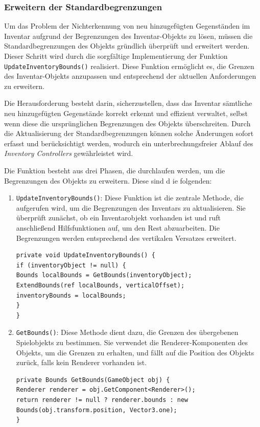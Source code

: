 \begin{itemize}
\subsubsection{Erweitern der Standardbegrenzungen}
Um das Problem der Nichterkennung von neu hinzugefügten Gegenständen im Inventar aufgrund der Begrenzungen des Inventar-Objekts
zu lösen, müssen die Standardbegrenzungen des Objekts gründlich überprüft und erweitert werden. Dieser Schritt wird
durch die sorgfältige Implementierung der Funktion \texttt{UpdateInventoryBounds()} realisiert. Diese Funktion ermöglicht
es, die Grenzen des Inventar-Objekts anzupassen und entsprechend der aktuellen Anforderungen zu erweitern.

Die Herausforderung besteht darin, sicherzustellen, dass das Inventar sämtliche neu hinzugefügten Gegenstände korrekt
erkennt und effizient verwaltet, selbst wenn diese die ursprünglichen Begrenzungen des Objekts überschreiten. Durch die
Aktualisierung der Standardbegrenzungen können solche Änderungen sofort erfasst und berücksichtigt werden, wodurch ein
unterbrechungsfreier Ablauf des \textit{Inventory Controllers} gewährleistet wird.

Die Funktion besteht aus drei Phasen, die durchlaufen werden, um die Begrenzungen des Objekts zu erweitern. Diese sind d
ie folgenden:

\begin{enumerate}
\item \texttt{UpdateInventoryBounds()}: Diese Funktion ist die zentrale Methode, die aufgerufen wird, um die Begrenzungen
des Inventars zu aktualisieren. Sie überprüft zunächst, ob ein Inventarobjekt vorhanden ist und ruft anschließend
Hilfsfunktionen auf, um den Rest abzuarbeiten. Die Begrenzungen werden entsprechend des vertikalen Versatzes erweitert.
\begin{lstlisting}[language={[Sharp]C}]
private void UpdateInventoryBounds() {
if (inventoryObject != null) {
Bounds localBounds = GetBounds(inventoryObject);
ExtendBounds(ref localBounds, verticalOffset);
inventoryBounds = localBounds;
}
}
\end{lstlisting}

\item \texttt{GetBounds()}: Diese Methode dient dazu, die Grenzen des übergebenen Spielobjekts zu bestimmen. Sie verwendet
die Renderer-Komponenten des Objekts, um die Grenzen zu erhalten, und fällt auf die Position des Objekts zurück, falls
kein Renderer vorhanden ist.
\begin{lstlisting}[language={[Sharp]C}]
private Bounds GetBounds(GameObject obj) {
Renderer renderer = obj.GetComponent<Renderer>();
return renderer != null ? renderer.bounds : new Bounds(obj.transform.position, Vector3.one);
}
\end{lstlisting}


\end{enumerate}
\end{itemize}
